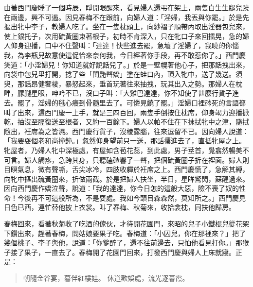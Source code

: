 由著西門慶睡了一個時辰，睜開眼醒來，看見婦人還弔在架上，兩隻白生生腿兒蹺在兩邊，興不可遏。因見春梅不在跟前，向婦人道：「淫婦，我丟與你罷。」於是先摳出牝中李子，教婦人吃了。坐在一隻枕頭上，向紗褶子順帶內取出淫器包兒來，使上銀托子，次用硫黃圈束著根子，初時不肯深入，只在牝口子來回擂晃，急的婦人仰身迎播，口中不住聲叫：「達達！快些進去罷，急壞了淫婦了，我曉的你惱我，為李瓶兒故意使這促恰來奈何我，今日經著你手段，再不敢惹你了。」西門慶笑道：「小淫婦兒！你知道就好說話兒了。」於是一壁幌著他心子，把那話拽出來，向袋中包兒里打開，捻了些「閨艷聲嬌」塗在蛙口內，頂入牝中，送了幾送。須臾，那話昂健奢棱，暴怒起來，垂首玩著往來抽拽，玩其出入之勢。那婦人在枕畔，朦朧星眼，呻吟不已，沒口子叫：「大雞巴達達，你不知使了甚麼行貨子進去。罷了，淫婦的毴心癢到骨髓里去了。可憐見饒了罷。」淫婦口裡硶死的言語都叫了出來，這西門慶一上手，就是三四百回，兩隻手倒按住枕席，仰身竭力迎播掀乾，抽沒至脛復送至根者，又約一百餘下。婦人以帕不住在下抹拭牝中之津，隨拭隨出，衽席為之皆濕。西門慶行貨子，沒棱露腦，往來逗留不已。因向婦人說道：「我要耍個老和尚撞鐘。」忽然仰身望前只一送，那話攮進去了，直抵牝屋之上。牝屋者，乃婦人牝中深極處，有屋如含苞花蕊，到此處，男子莖首，覺翕然暢美不可言。婦人觸疼，急跨其身，只聽磕碴響了一聲，把個硫黃圈子折在裡面。婦人則目瞑氣息，微有聲嘶，舌尖冰冷，四肢收軃於衽席之上。西門慶慌了，急解其縛，向牝中摳出硫黃圈來，折做兩截。於是把婦人扶坐，半日，星眸驚閃，蘇醒過來。因向西門慶作嬌泣聲，說道：「我的達達，你今日怎的這般大惡，險不喪了奴的性命！今後再不可這般所為，不是耍處。我如今頭目森森然，莫知所之。」西門慶見日色已西，連忙替他披上衣裳。叫了春梅、秋菊來，收拾衾枕，同扶他歸房。

春梅回來，看著秋菊收了吃酒的傢伙，才待開花園門，來昭的兒子小鐵棍兒從花架下鑽出來，趕著春梅，問姑娘要果子吃。春梅道：「小囚兒，你在那裡來？」把了幾個桃子、李子與他，說道：「你爹醉了，還不往前邊去，只怕他看見打你。」那猴子接了果子，一直去了。春梅開了花園門回來，打發西門慶與婦人上床就寢。正是：
\begin{quote}
朝隨金谷宴，暮伴紅樓娃。
休道歡娛處，流光逐暮霞。
\end{quote}

